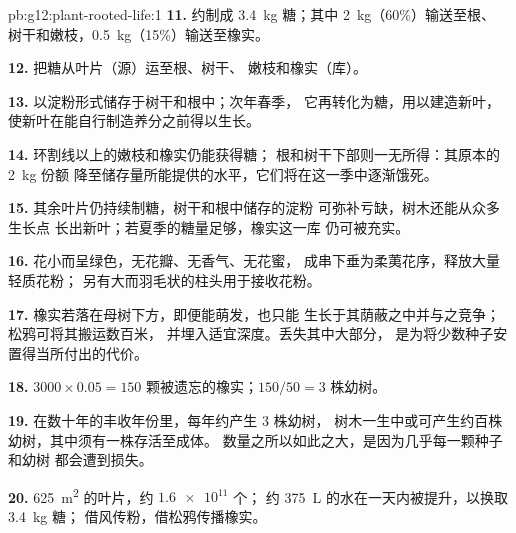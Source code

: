 \begin{solution}{pb:g12:plant-rooted-life:1}
\textbf{11.} 约制成 \qty{3.4}{kg} 糖；其中 \qty{2}{kg}（60\%）输送至根、
树干和嫩枝，\qty{0.5}{kg}（15\%）输送至橡实。

\textbf{12.} 把糖从叶片（源）运至根、树干、
嫩枝和橡实（库）。

\textbf{13.} 以淀粉形式储存于树干和根中；次年春季，
它再转化为糖，用以建造新叶，
使新叶在能自行制造养分之前得以生长。

\textbf{14.} 环割线以上的嫩枝和橡实仍能获得糖；
根和树干下部则一无所得：其原本的 \qty{2}{kg} 份额
降至储存量所能提供的水平，它们将在这一季中逐渐饿死。

\textbf{15.} 其余叶片仍持续制糖，树干和根中储存的淀粉
可弥补亏缺，树木还能从众多生长点
长出新叶；若夏季的糖量足够，橡实这一库
仍可被充实。

\textbf{16.} 花小而呈绿色，无花瓣、无香气、无花蜜，
成串下垂为柔荑花序，释放大量轻质花粉；
另有大而羽毛状的柱头用于接收花粉。

\textbf{17.} 橡实若落在母树下方，即便能萌发，也只能
生长于其荫蔽之中并与之竞争；松鸦可将其搬运数百米，
并埋入适宜深度。丢失其中大部分，
是为将少数种子安置得当所付出的代价。

\textbf{18.} $3000 \times 0.05 = 150$ 颗被遗忘的橡实；$150/50 = 3$
株幼树。

\textbf{19.} 在数十年的丰收年份里，每年约产生 3 株幼树，
树木一生中或可产生约百株幼树，其中须有一株存活至成体。
数量之所以如此之大，是因为几乎每一颗种子和幼树
都会遭到损失。

\textbf{20.} \qty{625}{m^2} 的叶片，约 $\num{1.6e11}$ 个；
约 \qty{375}{L} 的水在一天内被提升，以换取 \qty{3.4}{kg} 糖；
借风传粉，借松鸦传播橡实。
\end{solution}
